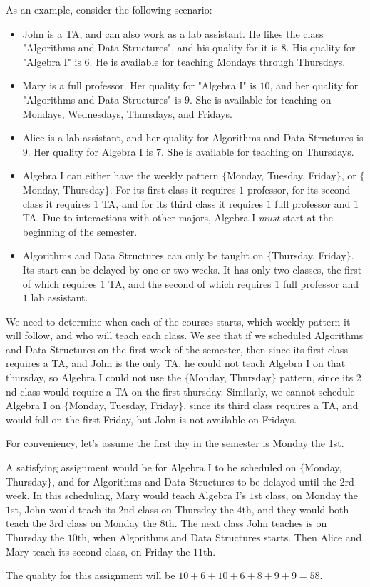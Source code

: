 As an example, consider the following scenario:
\begin{itemize}
\item John is a TA, and can also work as a lab assistant. He likes the class "Algorithms and Data Structures", and his quality for it is $8$. His quality for "Algebra I" is $6$. He is available for teaching Mondays through Thursdays.
\item Mary is a full professor. Her quality for "Algebra I" is $10$, and her quality for "Algorithms and Data Structures" is $9$. She is available for teaching on Mondays, Wednesdays, Thursdays, and Fridays.
\item Alice is a lab assistant, and her quality for Algorithms and Data Structures is $9$. Her quality for Algebra I is $7$. She is available for teaching on Thursdays.
\item Algebra I can either have the weekly pattern $\{$Monday, Tuesday, Friday$\}$, or $\{$Monday, Thursday$\}$. For its first class it requires $1$ professor, for its second class it requires $1$ TA, and for its third class it requires $1$ full professor and $1$ TA. Due to interactions with other majors, Algebra I \emph{must} start at the beginning of the semester.
\item Algorithms and Data Structures can only be taught on $\{$Thursday, Friday$\}$. Its start can be delayed by one or two weeks. It has only two classes, the first of which requires $1$ TA, and the second of which requires $1$ full professor and $1$ lab assistant.
\end{itemize}

We need to determine when each of the courses starts, which weekly pattern it will follow, and who will teach each class. We see that if we scheduled Algorithms and Data Structures on the first week of the semester, then since its first class requires a TA, and John is the only TA, he could not teach Algebra I on that thursday, so Algebra I could not use the $\{$Monday, Thursday$\}$ pattern, since its $2$nd class would require a TA on the first thursday. Similarly, we cannot schedule Algebra I on $\{$Monday, Tuesday, Friday$\}$, since its third class requires a TA, and would fall on the first Friday, but John is not available on Fridays.

For conveniency, let's assume the first day in the semester is Monday the 1st.

A satisfying assignment would be for Algebra I to be scheduled on $\{$Monday, Thursday$\}$, and for Algorithms and Data Structures to be delayed until the $2$rd week. In this scheduling, Mary would teach Algebra I's $1$st class, on Monday the $1$st, John would teach its $2$nd class on Thursday the $4$th, and they would both teach the $3$rd class on Monday the $8$th. The next class John teaches is on Thursday the $10$th, when Algorithms and Data Structures starts. Then Alice and Mary teach its second class, on Friday the $11$th.

The quality for this assignment will be $10 + 6 + 10 + 6 + 8 + 9 + 9 = 58$.
